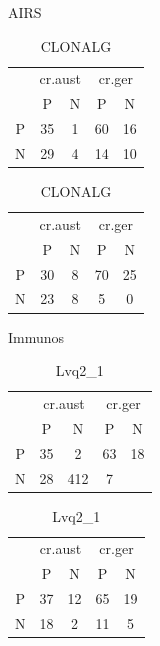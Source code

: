 \begin{table}
    \parbox{.45\linewidth}{
        \centering
        \caption{AIRS}
        \begin{tabular}{c|c c|c c}
            \multicolumn{1}{c}{}  & \multicolumn{2}{c}{cr.aust} & \multicolumn{2}{c}{cr.ger} \\
            \multirow{1}{2.5mm}{} & P & N & P & N \\
            \hline
            P & 35 & 1 & 60 & 16 \\
            N & 29 & 4 & 14 & 10 \\
        \end{tabular}
    }
    \hfill
    \parbox{.45\linewidth}{
        \centering
        \caption{CLONALG}
        \begin{tabular}{c|c c|c c}
            \multicolumn{1}{c}{}  & \multicolumn{2}{c}{cr.aust} & \multicolumn{2}{c}{cr.ger} \\
            \multirow{1}{2.5mm}{} & P & N & P & N \\
            \hline
            P & 30 & 8 & 70 & 25 \\
            N & 23 & 8 &  5 &  0 \\
        \end{tabular}
    }
\end{table}

\begin{table}
    \parbox{.45\linewidth}{
        \centering
        \caption{Immunos}
        \begin{tabular}{c|c c|c c}
            \multicolumn{1}{c}{}  & \multicolumn{2}{c}{cr.aust} & \multicolumn{2}{c}{cr.ger} \\
            \multirow{1}{2.5mm}{} & P & N & P & N \\
            \hline
            P & 35 & 2& 63 & 18 \\
            N & 28 & 412 &  7 \\
        \end{tabular}
    }
    \hfill
    \parbox{.45\linewidth}{
        \centering
        \caption{Lvq2\_1}
        \begin{tabular}{c|c c|c c}
            \multicolumn{1}{c}{}  & \multicolumn{2}{c}{cr.aust} & \multicolumn{2}{c}{cr.ger} \\
            \multirow{1}{2.5mm}{} & P & N & P & N \\
            \hline
            P & 37 & 12 & 65 & 19 \\
            N & 18 &  2 & 11 &  5 \\
        \end{tabular}
    }
\end{table}

